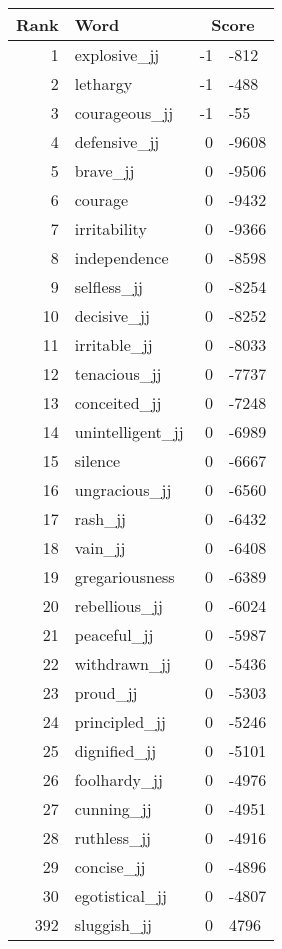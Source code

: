 \begin{longtable}[!htbp]{| rlr@{.}l |}
    \hline
    \textbf{Rank} & \textbf{Word} & \multicolumn{2}{c|}{\textbf{Score}} \\
    \hline
    \endhead
    1 & explosive\_jj & -1 & -812 \\
    2 & lethargy & -1 & -488 \\
    3 & courageous\_jj & -1 & -55 \\
    4 & defensive\_jj & 0 & -9608 \\
    5 & brave\_jj & 0 & -9506 \\
    6 & courage & 0 & -9432 \\
    7 & irritability & 0 & -9366 \\
    8 & independence & 0 & -8598 \\
    9 & selfless\_jj & 0 & -8254 \\
    10 & decisive\_jj & 0 & -8252 \\
    11 & irritable\_jj & 0 & -8033 \\
    12 & tenacious\_jj & 0 & -7737 \\
    13 & conceited\_jj & 0 & -7248 \\
    14 & unintelligent\_jj & 0 & -6989 \\
    15 & silence & 0 & -6667 \\
    16 & ungracious\_jj & 0 & -6560 \\
    17 & rash\_jj & 0 & -6432 \\
    18 & vain\_jj & 0 & -6408 \\
    19 & gregariousness & 0 & -6389 \\
    20 & rebellious\_jj & 0 & -6024 \\
    21 & peaceful\_jj & 0 & -5987 \\
    22 & withdrawn\_jj & 0 & -5436 \\
    23 & proud\_jj & 0 & -5303 \\
    24 & principled\_jj & 0 & -5246 \\
    25 & dignified\_jj & 0 & -5101 \\
    26 & foolhardy\_jj & 0 & -4976 \\
    27 & cunning\_jj & 0 & -4951 \\
    28 & ruthless\_jj & 0 & -4916 \\
    29 & concise\_jj & 0 & -4896 \\
    30 & egotistical\_jj & 0 & -4807 \\
    392 & sluggish\_jj & 0 & 4796 \\

\end{longtable}
